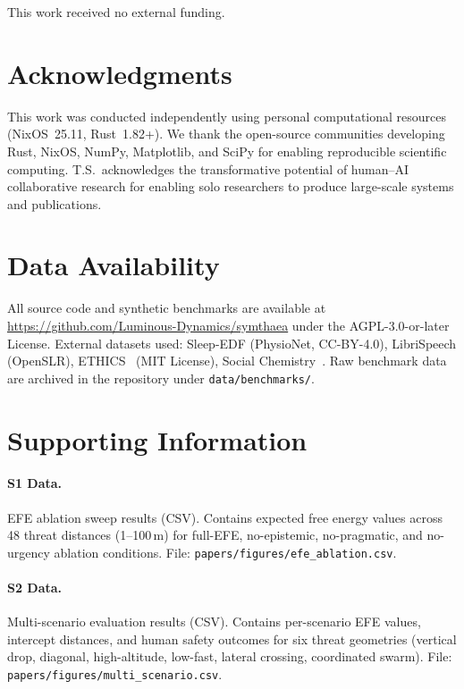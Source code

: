 \documentclass[10pt,letterpaper]{article}
\begin{document}
This work received no external funding.

\section*{Acknowledgments}

This work was conducted independently using personal computational resources
(NixOS~25.11, Rust~1.82+). We thank the open-source communities developing
Rust, NixOS, NumPy, Matplotlib, and SciPy for enabling reproducible scientific
computing. T.S.\ acknowledges the transformative potential of human--AI
collaborative research for enabling solo researchers to produce
large-scale systems and publications.

\section*{Data Availability}

All source code and synthetic benchmarks are available at
\url{https://github.com/Luminous-Dynamics/symthaea} under the AGPL-3.0-or-later License.
External datasets used: Sleep-EDF (PhysioNet, CC-BY-4.0), LibriSpeech
(OpenSLR), ETHICS~\cite{hendrycks2021aligning} (MIT License), Social
Chemistry~\cite{forbes2020social}. Raw benchmark data are archived in the
repository under \texttt{data/benchmarks/}.

\section*{Supporting Information}

\paragraph*{S1 Data.}
\label{s1-data}
{EFE ablation sweep results (CSV). Contains expected free energy values across
48 threat distances (1--100\,m) for full-EFE, no-epistemic, no-pragmatic, and
no-urgency ablation conditions. File:
\texttt{papers/figures/efe\_ablation.csv}.}

\paragraph*{S2 Data.}
\label{s2-data}
{Multi-scenario evaluation results (CSV). Contains per-scenario EFE values,
intercept distances, and human safety outcomes for six threat geometries
(vertical drop, diagonal, high-altitude, low-fast, lateral crossing,
coordinated swarm). File: \texttt{papers/figures/multi\_scenario.csv}.}
\end{document}
